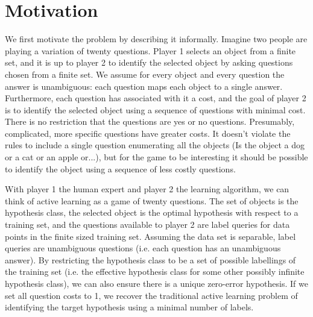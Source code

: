 \documentclass{article}
\begin{document}
\section{Motivation}
We first motivate the problem by describing it informally.
Imagine two people are playing a variation of twenty questions.  Player 1
selects an object from a finite set, and it is up to
player 2 to identify the selected object by asking questions chosen
from a finite set.  We assume for every object and
every question the answer is unambiguous: each question maps each
object to a single answer.  Furthermore, each question has associated
with it a cost, and the goal of player 2 is to identify
the selected object using a sequence of questions with minimal cost.
There is no restriction that the questions are yes or no questions.  
Presumably, complicated, more
specific questions have greater costs.  It doesn't violate the rules
to include a single question enumerating all the objects (Is the
object a dog or a cat or an apple or...), but for the game to be
interesting it should be possible to identify the object using a
sequence of less costly questions. 

With player 1 the human expert and player 2 the learning algorithm, we
can think of active learning as a game of twenty questions.  The set
of objects is the hypothesis class, the selected object is the optimal
hypothesis with respect to a training set, and the questions available
to player 2 are label queries for data points in the finite sized
training set.  Assuming the data set is separable, label queries are
unambiguous questions (i.e. each question has an unambiguous answer).
By restricting the hypothesis class to be a set of possible labellings
of the training set (i.e. the effective hypothesis class for some
other possibly infinite hypothesis class), we can also ensure there is
a unique zero-error hypothesis.  If we set all question costs to 1, we
recover the traditional active learning problem of identifying the
target hypothesis using a minimal number of labels.
\end{document}
